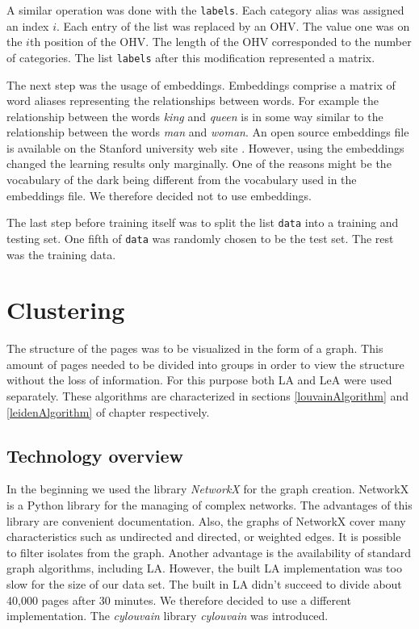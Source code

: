 A similar operation was done with the \texttt{labels}. Each category alias was assigned an index $i$. Each entry of the list was replaced by an OHV. The value one was on the $i$th position of the OHV. The length of the OHV corresponded to the number of categories. The list \texttt{labels} after this modification represented a matrix.

The next step was the usage of embeddings. Embeddings comprise a matrix of word aliases representing the relationships between words. For example the relationship between the words \textit{king} and \textit{queen} is in some way similar to the relationship between the words \textit{man} and \textit{woman}. An open source embeddings file is available on the Stanford university web site \cite{embeddings}. However, using the embeddings changed the learning results only marginally. One of the reasons might be the vocabulary of the dark being different from the vocabulary used in the embeddings file. We therefore decided not to use embeddings.

The last step before training itself was to split the list \texttt{data} into a training and testing set. One fifth of \texttt{data} was randomly chosen to be the test set. The rest was the training data.








\section{Clustering}\label{ClusteringDevelopment}
The structure of the pages was to be visualized in the form of a graph. This amount of pages needed to be divided into groups in order to view the structure without the loss of information. For this purpose both LA and LeA were used separately. These algorithms are characterized in sections \ref{louvainAlgorithm} and \ref{leidenAlgorithm} of chapter respectively. 

\subsection{Technology overview} \label{ClusteringTechonologyOverview}
In the beginning we used the library \textit{NetworkX} \cite{networkX} for the graph creation. NetworkX is a Python library for the managing of complex networks. The advantages of this library are convenient documentation. Also, the graphs of NetworkX cover many characteristics such as undirected and directed, or weighted edges. It is possible to filter isolates from the graph.  Another advantage is the availability of standard graph algorithms, including LA. However, the built LA implementation was too slow for the size of our data set. The built in LA didn't succeed to divide about 40,000 pages after 30 minutes. We therefore decided to use a different implementation. The \textit{cylouvain} library \textit{cylouvain} was introduced. 


